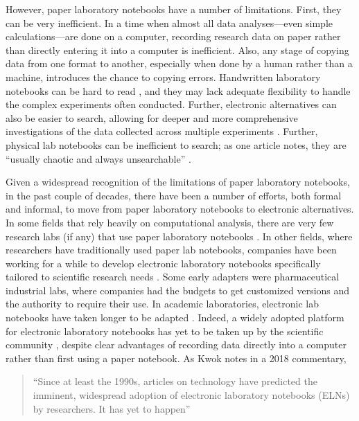 \documentclass[]{tufte-book}
\begin{document}
However, paper laboratory notebooks have a number of limitations. First, they
can be very inefficient. In a time when almost all data analyses---even simple
calculations---are done on a computer, recording research data on paper rather
than directly entering it into a computer is inefficient. Also, any stage of
copying data from one format to another, especially when done by a human rather
than a machine, introduces the chance to copying errors. Handwritten laboratory
notebooks can be hard to read \citep{butler2005electronic, perkel2011coding}, and
they may lack adequate flexibility to handle the complex experiments often conducted.
Further, electronic alternatives can also be easier to search, allowing for
deeper and more comprehensive investigations of the data collected across
multiple experiments \citep{giles2012digital, butler2005electronic, perkel2011coding}. Further, physical lab notebooks can be inefficient to
search; as one article notes, they are ``usually chaotic and always unsearchable''
\citep{perkel2011coding}.

Given a widespread recognition of the limitations of paper laboratory notebooks,
in the past couple of decades, there have been a number of efforts, both formal
and informal, to move from paper laboratory notebooks to electronic
alternatives. In some fields that rely heavily on computational analysis, there
are very few research labs (if any) that use paper laboratory notebooks
\citep{butler2005electronic}. In other fields, where researchers have traditionally
used paper lab notebooks, companies have been working for a while to develop
electronic laboratory notebooks specifically tailored to scientific research
needs \citep{giles2012digital}. Some early adapters were pharmaceutical industrial
labs, where companies had the budgets to get customized versions and the
authority to require their use. In academic laboratories, electronic lab
notebooks have taken longer to be adapted \citep{giles2012digital, butler2005electronic}. Indeed, a widely adopted platform for electronic laboratory
notebooks has yet to be taken up by the scientific community \citep{kwok2018lab},
despite clear advantages of recording data directly into a computer rather than
first using a paper notebook. As Kwok notes in a 2018 commentary,

\begin{quote}
``Since at least the 1990s, articles on technology have predicted the imminent,
widespread adoption of electronic laboratory notebooks (ELNs) by researchers. It has
yet to happen'' \citep{kwok2018lab}
\end{quote}
\end{document}
